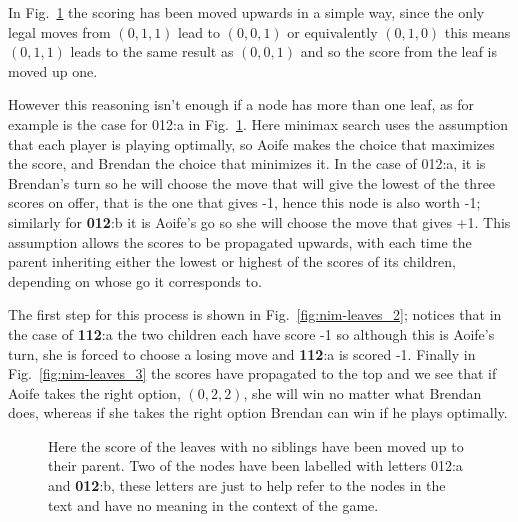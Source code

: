 \documentclass[11pt,a4paper]{scrartcl}
\begin{document}
In Fig.~\ref{fig:nim-leaves_1} the scoring has been moved upwards in a
simple way, since the only legal moves from $(0,1,1)$ lead to
$(0,0,1)$ or equivalently $(0,1,0)$ this means $(0,1,1)$ leads to the
same result as $(0,0,1)$ and so the score from the leaf is moved up
one. 

However this reasoning isn't enough if a node has more than one leaf,
as for example is the case for 012:a in
Fig.~\ref{fig:nim-leaves_1}. Here minimax search uses the
assumption that each player is playing optimally, so Aoife makes the
choice that maximizes the score, and Brendan the choice that minimizes
it. In the case of 012:a, it is Brendan's turn so he will choose the
move that will give the lowest of the three scores on offer, that is
the one that gives -1, hence this node is also worth -1; similarly for
\textbf{012}:b it is Aoife's go so she will choose the move that gives
+1. This assumption allows the scores to be propagated upwards, with
each time the parent inheriting either the lowest or highest of the
scores of its children, depending on whose go it corresponds to. 

The first step for this process is shown in
Fig.~\ref{fig:nim-leaves_2}; notices that in the case of
\textbf{112}:a the two children each have score -1 so although this is
Aoife's turn, she is forced to choose a losing move and \textbf{112}:a
is scored -1. Finally in Fig.~\ref{fig:nim-leaves_3} the scores have
propagated to the top and we see that if Aoife takes the right option,
$(0,2,2)$, she will win no matter what Brendan does, whereas if she
takes the right option Brendan can win if he plays optimally.




\begin{figure}
\begin{center}
\end{center}
\caption{Here the score of the leaves with no siblings have been moved
  up to their parent. Two of the nodes have been labelled with letters
  012:a and \textbf{012}:b, these letters are just to help refer to
  the nodes in the text and have no meaning in the context of the
  game. \label{fig:nim-leaves_1}}
\end{figure}
\end{document}

